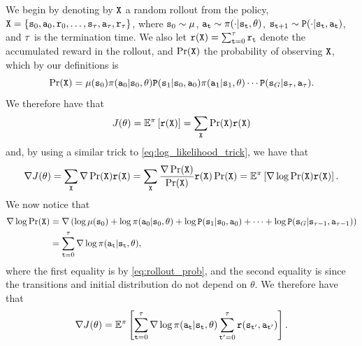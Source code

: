 We begin by denoting by $\texttt{X}$ a random rollout from the policy, $\texttt{X} = \{{\tt s}_0,{\tt a}_0,{\tt r}_0,\dots,{\tt s}_\tau, {\tt a}_\tau, {\tt r}_\tau \}$, where ${\tt s}_0 \sim \mu$, ${\tt a}_{\tt t}\sim \pi(\cdot|{\tt s}_{\tt t},\theta)$, ${\tt s}_{{\tt t}+1} \sim {\tt P} (\cdot | {\tt s}_{\tt t}, {\tt a}_{\tt t})$, and $\tau$ is the termination time. We also let ${\tt r}(\texttt{X}) = \sum_{{\tt t}=0}^\tau {\tt r}_{\tt t}$ denote the accumulated reward in the rollout, and $\Pr(\texttt{X})$ the probability of observing $\texttt{X}$, which by our definitions is 
\begin{equation}\label{eq:rollout_prob}
\Pr(\texttt{X}) = \mu({\tt s}_0)\pi({\tt a}_0|{\tt s}_0,\theta){\tt P}({\tt s}_1|{\tt s}_0,{\tt a}_0)\pi({\tt a}_1|{\tt s}_1,\theta)\cdots{\tt P}({\tt s}_G|{\tt s}_{\tau},{\tt a}_{\tau}).
\end{equation}
We therefore have that
\begin{equation*}
    J(\theta) = \mathbb{E}^{\pi}\left[ {\tt r}(\texttt{X}) \right] = \sum_{\texttt{X}} \Pr(\texttt{X}) {\tt r}(\texttt{X})
\end{equation*}
and, by using a similar trick to \eqref{eq:log_likelihood_trick}, we have that 
\begin{equation*}
    \nabla J(\theta) = \sum_{\texttt{X}} \nabla \Pr(\texttt{X}) {\tt r}(\texttt{X}) = \sum_{\texttt{X}} \frac{\nabla \Pr(\texttt{X})}{\Pr(\texttt{X})} {\tt r}(\texttt{X}) \Pr(\texttt{X}) = \mathbb{E}^{\pi}\left[ \nabla \log \Pr(\texttt{X}){\tt r}(\texttt{X}) \right].
\end{equation*}
We now notice that 
\begin{equation*}
\begin{split}
    \nabla \log \Pr(\texttt{X}) &= \nabla \left( \log \mu({\tt s}_0) + \log \pi({\tt a}_0|{\tt s}_0,\theta) + \log{\tt P}({\tt s}_1|{\tt s}_0,{\tt a}_0) + \dots + \log{\tt P}({\tt s}_G|{\tt s}_{\tau-1},{\tt a}_{\tau-1})\right) \\
    &= \sum_{{\tt t}=0}^{\tau} \nabla\log \pi({\tt a}_{\tt t}|{\tt s}_{\tt t},\theta),
\end{split}
\end{equation*}
where the first equality is by \eqref{eq:rollout_prob}, and the second equality is since the transitions and initial distribution do not depend on $\theta$. We therefore have that
\begin{equation}\label{eq:pg_score_1}
    \nabla J(\theta) = \mathbb{E}^{\pi}\left[ \sum_{{\tt t}=0}^\tau \nabla\log \pi({\tt a}_{\tt t}|{\tt s}_{\tt t},\theta) \sum_{{\tt t}'=0}^\tau {\tt r}({\tt s}_{{\tt t}'},{\tt a}_{{\tt t}'})\right].
\end{equation}
